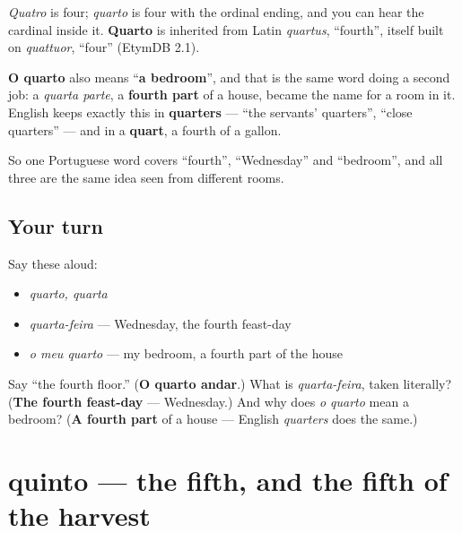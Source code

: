 \begin{cousinweb}
\emph{Quatro} is four; \emph{quarto} is four with the ordinal ending, and you can hear the cardinal inside it. \textbf{Quarto} is inherited from Latin \emph{quartus}, \textquotedblleft{}fourth\textquotedblright{}, itself built on \emph{quattuor}, \textquotedblleft{}four\textquotedblright{} (EtymDB 2.1).

\textbf{O quarto} also means \textquotedblleft{}\textbf{a bedroom}\textquotedblright{}, and that is the same word doing a second job: a \emph{quarta parte}, a \textbf{fourth part} of a house, became the name for a room in it. English keeps exactly this in \textbf{quarters} — \textquotedblleft{}the servants' quarters\textquotedblright{}, \textquotedblleft{}close quarters\textquotedblright{} — and in a \textbf{quart}, a fourth of a gallon.

So one Portuguese word covers \textquotedblleft{}fourth\textquotedblright{}, \textquotedblleft{}Wednesday\textquotedblright{} and \textquotedblleft{}bedroom\textquotedblright{}, and all three are the same idea seen from different rooms.
\end{cousinweb}

\subsection*{Your turn}
Say these aloud:

\begin{itemize}
\raggedright
  \item \emph{quarto, quarta}
  \item \emph{quarta-feira} — Wednesday, the fourth feast-day
  \item \emph{o meu quarto} — my bedroom, a fourth part of the house
\end{itemize}

\begin{tcolorbox}[breakable,colback=teal!4,colframe=teal!35!black,title={Before you move on}]
Say \textquotedblleft{}the fourth floor.\textquotedblright{} (\textbf{O quarto andar}.) What is \emph{quarta-feira}, taken literally? (\textbf{The fourth feast-day} — Wednesday.) And why does \emph{o quarto} mean a bedroom? (\textbf{A fourth part} of a house — English \emph{quarters} does the same.)
\end{tcolorbox}
\section[quinto / quinta]{quinto — the fifth, and the fifth of the harvest}


